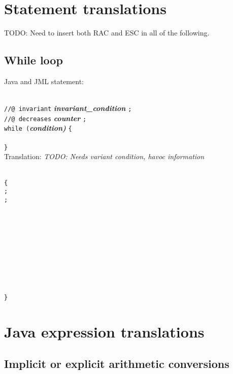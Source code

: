 
\chapter{Statement translations}

TODO: Need to insert both RAC and ESC in all of the following.

\section{While loop}

\noindent
Java and JML statement:

\noindent
{\tt }\\
{\tt //@ invariant} {\em\bf invariant\_condition} {\tt ;}\\
{\tt //@ decreases} {\em\bf counter} {\tt ;}\\
{\tt while (}{\em\bf condition) }{\tt \{}\\
\\
{\tt \}}\\

\noindent
Translation: {\em TODO: Needs variant condition, havoc information}

\noindent
{\tt }\\
{\tt \{}\\
 {\tt ;}\\
 {\tt ;}\\
\\
\ind{}\\
\ind{}\\
\ind\ind{}\\
\ind\ind{}\\
\ind\ind {\tt \}}\\
\ind{}\\
\ind{}\\
\ind {\tt \} }\\
{\tt \}}

\chapter{Java expression translations}

\section{Implicit or explicit arithmetic conversions}

